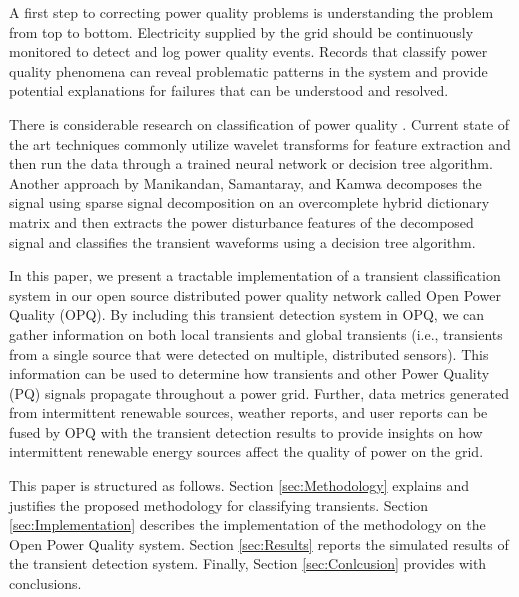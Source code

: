 \documentclass[10pt, conference, compsocconf]{IEEEtran}
\begin{document}
A first step to correcting power quality problems is understanding the problem from top to bottom. Electricity supplied by the grid should be continuously monitored to detect and log power quality events. Records that classify power quality phenomena can reveal problematic patterns in the system and provide potential explanations for failures that can be understood and resolved.

There is considerable research on classification of power quality \cite{Garrido:2014:PhenomenaClassification, Manikandan:2014:PQClassificationUsingSSD, Thirumala:2016:PQClassificationUsingWavelet, Rodriguez:2014:PQClassificationUsingANN, Tse:2012:PQClassificationUsingHHT}. Current state of the art techniques commonly utilize wavelet transforms for feature extraction and then run the data through a trained neural network or decision tree algorithm.  Another approach by Manikandan, Samantaray, and Kamwa \cite{Manikandan:2014:PQClassificationUsingSSD} decomposes the signal using sparse signal decomposition on an overcomplete hybrid dictionary matrix and then extracts the power disturbance features of the decomposed signal and classifies the transient waveforms using a decision tree algorithm.

In this paper, we present a tractable implementation of a transient classification system in our open source distributed power quality network called Open Power Quality (OPQ). By including this transient detection system in OPQ, we can gather information on both local transients and global transients (i.e., transients from a single source that were detected on multiple, distributed sensors). This information can be used to determine how transients and other Power Quality (PQ) signals propagate throughout a power grid. Further, data metrics generated from intermittent renewable sources, weather reports, and user reports can be fused by OPQ with the transient detection results to provide insights on how intermittent renewable energy sources affect the quality of power on the grid.

This paper is structured as follows. Section \ref{sec:Methodology} explains and justifies the proposed methodology for classifying transients. Section \ref{sec:Implementation} describes the implementation of the methodology on the Open Power Quality system. Section \ref{sec:Results} reports the simulated results of the transient detection system. Finally, Section \ref{sec:Conlcusion} provides with conclusions.

\end{document}
